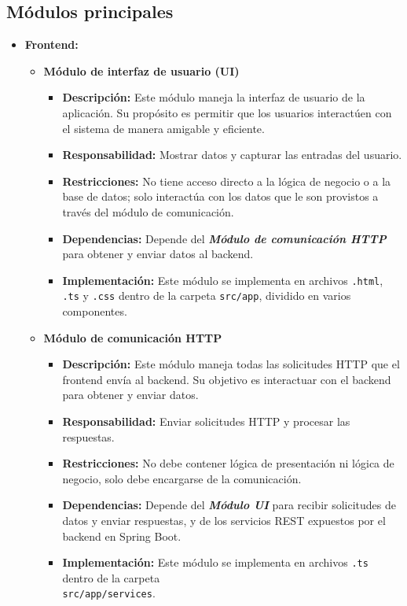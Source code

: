 \documentclass{article} %
\begin{document}
    \subsection{Módulos principales}
    \begin{itemize}
        \item \textbf{Frontend:} 
        \begin{itemize}
            \item \textbf{Módulo de interfaz de usuario (UI)}
                \begin{itemize}
                    \item \textbf{Descripción:} Este módulo maneja la interfaz de usuario de la aplicación. Su propósito es permitir que los usuarios interactúen con el sistema de manera amigable y eficiente.
                    \item \textbf{Responsabilidad:} Mostrar datos y capturar las entradas del usuario.
                    \item \textbf{Restricciones:} No tiene acceso directo a la lógica de negocio o a la base de datos; solo interactúa con los datos que le son provistos a través del módulo de comunicación.
                    \item \textbf{Dependencias:} Depende del \textbf{\emph{Módulo de comunicación HTTP}} para obtener y enviar datos al backend.
                    \item \textbf{Implementación:} Este módulo se implementa en archivos \texttt{.html}, \texttt{.ts} y \texttt{.css} dentro de la carpeta \texttt{src/app}, dividido en varios componentes.
                \end{itemize}
            \item \textbf{Módulo de comunicación HTTP}
                \begin{itemize}
                    \item \textbf{Descripción:} Este módulo maneja todas las solicitudes HTTP que el frontend envía al backend. Su objetivo es interactuar con el backend para obtener y enviar datos.
                    \item \textbf{Responsabilidad:} Enviar solicitudes HTTP y procesar las respuestas.
                    \item \textbf{Restricciones:} No debe contener lógica de presentación ni lógica de negocio, solo debe encargarse de la comunicación.
                    \item \textbf{Dependencias:} Depende del \textbf{\emph{Módulo UI}} para recibir solicitudes de datos y enviar respuestas, y de los servicios REST expuestos por el backend en Spring Boot.
                    \item \textbf{Implementación:} Este módulo se implementa en archivos \texttt{.ts} dentro de la carpeta \\\texttt{src/app/services}.
                \end{itemize}
        \end{itemize}
        

\end{itemize}
\end{document}
